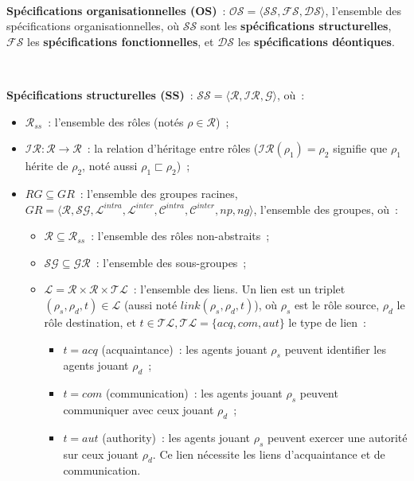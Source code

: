 \

\noindent \textbf{Spécifications organisationnelles (OS)}~: \quad $\mathcal{OS} = \langle \mathcal{SS}, \mathcal{FS}, \mathcal{DS} \rangle$, l'ensemble des spécifications organisationnelles, où $\mathcal{SS}$ sont les \textbf{spécifications structurelles}, $\mathcal{FS}$ les \textbf{spécifications fonctionnelles}, et $\mathcal{DS}$ les \textbf{spécifications déontiques}.

\

\noindent \textbf{Spécifications structurelles (SS)}~: \quad $\mathcal{SS} = \langle \mathcal{R}, \mathcal{IR}, \mathcal{G} \rangle$, où~:

\begin{itemize}
  \item $\mathcal{R}_{ss}$~: l'ensemble des rôles (notés $\rho \in \mathcal{R}$)~;
  \item $\mathcal{IR}: \mathcal{R} \rightarrow \mathcal{R}$~: la relation d'héritage entre rôles ($\mathcal{IR}(\rho_1) = \rho_2$ signifie que $\rho_1$ hérite de $\rho_2$, noté aussi $\rho_1 \sqsubset \rho_2$)~;
  \item $RG \subseteq GR$~: l'ensemble des groupes racines, $GR = \langle \mathcal{R}, \mathcal{SG}, \mathcal{L}^{intra}, \mathcal{L}^{inter}, \mathcal{C}^{intra}, \mathcal{C}^{inter}, np, ng \rangle$, l'ensemble des groupes, où~:
        \begin{itemize}
          \item $\mathcal{R} \subseteq \mathcal{R}_{ss}$~: l'ensemble des rôles non-abstraits~;
          \item $\mathcal{SG} \subseteq \mathcal{GR}$~: l'ensemble des sous-groupes~;
          \item $\mathcal{L} = \mathcal{R} \times \mathcal{R} \times \mathcal{TL}$~: l'ensemble des liens. Un lien est un triplet $(\rho_s,\rho_d,t) \in \mathcal{L}$ (aussi noté $link(\rho_s,\rho_d,t)$), où $\rho_s$ est le rôle source, $\rho_d$ le rôle destination, et $t \in \mathcal{TL}, \mathcal{TL} = \{acq, com, aut\}$ le type de lien~:
                \begin{itemize}
                  \item $t = acq$ (acquaintance)~: les agents jouant $\rho_s$ peuvent identifier les agents jouant $\rho_d$~;
                  \item $t = com$ (communication)~: les agents jouant $\rho_s$ peuvent communiquer avec ceux jouant $\rho_d$~;
                  \item $t = aut$ (authority)~: les agents jouant $\rho_s$ peuvent exercer une autorité sur ceux jouant $\rho_d$. Ce lien nécessite les liens d'acquaintance et de communication.

\end{itemize}
\end{itemize}
\end{itemize}
